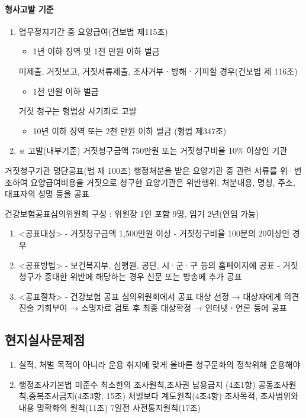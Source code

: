 \paragraph{형사고발 기준}
\begin{enumerate}\tightlist
\item 업무정지기간 중 요양급여(건보법 제115조)
	\begin{itemize}\tightlist
	\item 1년 이하 징역 및 1천 만원 이하 벌금
	\end{itemize}
 미제출, 거짓보고, 거짓서류제출, 조사거부ㆍ방해ㆍ기피할 경우(건보법 제 116조)
	\begin{itemize}\tightlist
	\item 1천 만원 이하 벌금
	\end{itemize}
 거짓 청구는 형법상 사기죄로 고발
	\begin{itemize}\tightlist
	\item 10년 이하 징역 또는 2천 만원 이하 벌금 (형법 제347조)
	\end{itemize}
\item ※ 고발(내부기준) 거짓청구금액 750만원 또는 거짓청구비율 10\% 이상인 기관
\end{enumerate}	
\begin{commentbox}{거짓청구기관 명단공표(법 제 100조)}
행정처분을 받은 요양기관 중 관련 서류를 위·변조하여 요양급여비용을 거짓으로 청구한 요양기관은 위반행위, 처분내용, 명칭, 주소, 대표자의 성명 등을 공표 \par
건강보험공표심의위원회 구성 : 위원장 1인 포함 9명, 임기 2년(연임 가능)\par
\begin{enumerate}\tightlist
\item <공표대상> - 거짓청구금액 1,500만원 이상 - 거짓청구비율 100분의 20이상인 경우
\item <공표방법> - 보건복지부, 심평원, 공단, 시·군·구 등의 홈페이지에 공표 - 거짓청구가 중대한 위반에 해당하는 경우 신문 또는 방송에 추가 공표
\item <공표절차> - 건강보험 공표 심의위원회에서 공표 대상 선정 → 대상자에게 의견진술 기회부여 → 소명자료 검토 후 최종 대상확정 → 인터넷ㆍ언론 등에 공표	
\end{enumerate}
\end{commentbox}

\subsection{현지실사문제점 }
\begin{enumerate}[1)]\tightlist
\item 실적, 처벌 목적이 아니라 운용 취지에 맞게 올바른 청구문화의 정착위해 운용해야 
\item 행정조사기본법 미준수  
    최소한의 조사원칙,조사권 남용금지 (4조1항)
    공동조사원칙,중복조사금지(4조3항, 15조)
    처벌보다 계도원칙(4조4항)
    조사목적, 조사범위와 내용 명확화의 원칙(11조)
    7일전 사전통지원칙(17조)
\end{enumerate}


